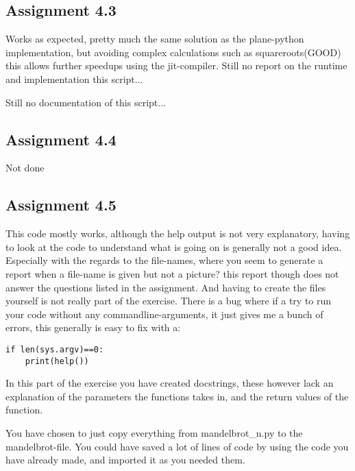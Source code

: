 \documentclass[a4paper]{article}
\begin{document}
\subsection*{Assignment 4.3}


Works as expected, pretty much the same solution as the plane-python implementation, but avoiding complex calculations such as squareroots(GOOD) this allows further speedups using the jit-compiler. 
\medskip
Still no report on the runtime and implementation this script...

\medskip

Still no documentation of this script...

\subsection*{Assignment 4.4}

Not done

\subsection*{Assignment 4.5}


This code mostly works, although the help output is not very explanatory, having to look at the code to understand what is going on is generally not a good idea. Especially with the regards to the file-names, where you seem to generate a report when a file-name is given but not a picture? this report though does not answer the questions listed in the assignment. And having to create the files yourself is not really part of the exercise. There is a bug where if a try to run your code without any commandline-arguments, it just gives me a bunch of errors, this generally is easy to fix with a:
\begin{verbatim}
if len(sys.argv)==0:
    print(help())
\end{verbatim}

\medskip

In this part of the exercise you have created docstrings, these however lack an explanation of the parameters the functions takes in, and the return values of the function.

\medskip

You have chosen to just copy everything from mandelbrot\_n.py to the mandelbrot-file. You could have saved a lot of lines of code by using the code you have already made, and imported it as you needed them.
\end{document}
